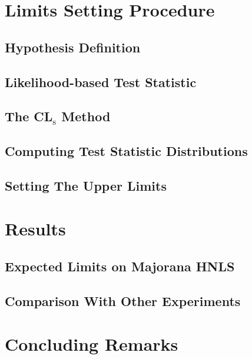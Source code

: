 \section{Limits Setting Procedure}

\subsection{Hypothesis Definition}

\subsection{Likelihood-based Test Statistic}

\subsection{The CL$_{\mathrm{s}}$ Method}

\subsection{Computing Test Statistic Distributions}

\subsection{Setting The Upper Limits}

\section{Results}

\subsection{Expected Limits on Majorana HNLS}

\subsection{Comparison With Other Experiments}

\section{Concluding Remarks}
